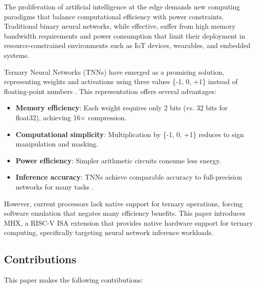 \documentclass[conference,10pt]{IEEEtran}
\newcommand{\mhx}{\textsc{MHX\texttrademark}}
\newcommand{\riscv}{RISC-V}
\begin{document}
The proliferation of artificial intelligence at the edge demands new computing paradigms that balance computational efficiency with power constraints. Traditional binary neural networks, while effective, suffer from high memory bandwidth requirements and power consumption that limit their deployment in resource-constrained environments such as IoT devices, wearables, and embedded systems.

Ternary Neural Networks (TNNs) have emerged as a promising solution, representing weights and activations using three values \{-1, 0, +1\} instead of floating-point numbers \cite{li2016ternary}. This representation offers several advantages:

\begin{itemize}
    \item \textbf{Memory efficiency}: Each weight requires only 2 bits (vs. 32 bits for float32), achieving 16$\times$ compression.
    \item \textbf{Computational simplicity}: Multiplication by \{-1, 0, +1\} reduces to sign manipulation and masking.
    \item \textbf{Power efficiency}: Simpler arithmetic circuits consume less energy.
    \item \textbf{Inference accuracy}: TNNs achieve comparable accuracy to full-precision networks for many tasks \cite{alemdar2017ternary}.
\end{itemize}

However, current processors lack native support for ternary operations, forcing software emulation that negates many efficiency benefits. This paper introduces \mhx{}, a \riscv{} ISA extension that provides native hardware support for ternary computing, specifically targeting neural network inference workloads.

\subsection{Contributions}

This paper makes the following contributions:
\end{document}
